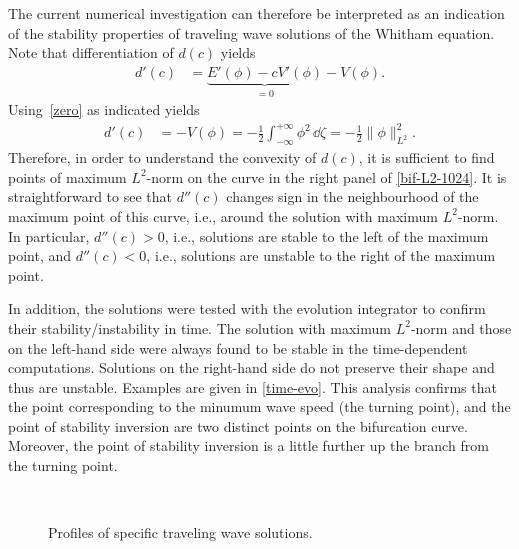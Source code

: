 The current numerical investigation can therefore be interpreted as an indication of the
stability properties of traveling wave solutions of the Whitham equation.
Note that differentiation of $d(c)$ yields
\begin{align*}
	d '(c) &= \underbrace{E'(\phi) - c V'(\phi)}_{=0} - V(\phi).
\end{align*}
Using~\eqref{zero} as indicated yields
\begin{align}
	d '(c) &= - V(\phi) = - \frac{1}{2} \int_{-\infty}^{+\infty} \phi ^2\,\dd\zeta = - \frac{1}{2}\|\phi\|_{L^2}^2 . 
\label{d'c}
\end{align}
Therefore, in order to understand the convexity of $d(c)$, it is sufficient
to find points of maximum $L^2$-norm on the curve in the right panel
of \autoref{bif-L2-1024}.
It is straightforward to see that $d''(c)$ changes sign in the neighbourhood of the maximum point 
of this curve, i.e., around the solution with maximum $L^2$-norm. 
In particular, $d''(c) > 0$, i.e., solutions are stable to the left of the maximum point, 
and $d''(c) < 0$, i.e., solutions are unstable to the right of the maximum point.
	
In addition, the solutions were tested with the evolution integrator to confirm their stability/instability in time. 
The solution with maximum $L^2$-norm and those on the left-hand side were always found to be stable in 
the time-dependent computations.
Solutions on the right-hand side do not preserve their shape and thus are unstable. 
Examples are given in \autoref{time-evo}. 
This analysis confirms that 
the point corresponding to the minumum wave speed (the turning point), 
and the point of stability inversion are two distinct points on the bifurcation curve.
Moreover, the point of stability inversion
is a little further up the branch from the turning point.

\begin{figure}[t]
\centering
{}
~%
\caption{\small Profiles of specific traveling wave solutions.}
\label{3waves}
\end{figure} 





